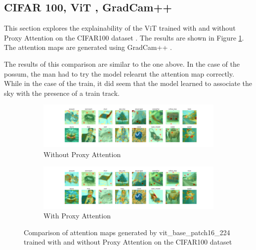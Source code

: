\documentclass[a4paper,11pt,openright]{book}
\begin{document}
\subsection{CIFAR 100, ViT , GradCam++}
This section explores the explainability of the ViT \cite{dosovitskiyImageWorth16x162021} trained with and without Proxy Attention on the CIFAR100 dataset \cite{krizhevskyLearningMultipleLayers}. The results are shown in Figure \ref{fig:vit_cifar100}. The attention maps are generated using GradCam++ \cite{chattopadhayGradCAMGeneralizedGradientBased2018}.

The results of this comparison are similar to the one above. In the case of the possum, the man had to try the model relearnt the attention map correctly. While in the case of the train, it did seem that the model learned to associate the sky with the presence of a train track. 

\begin{figure}[!htb]
        \begin{subfigure}[b]{1\textwidth}
            \includegraphics[width=\linewidth]{images/cifar100_vit_base_patch16_224_noproxy_0.pdf}
            \caption{Without Proxy Attention}
        \end{subfigure}
        \begin{subfigure}[b]{1\textwidth}
            \includegraphics[width=\linewidth]{images/cifar100_vit_base_patch16_224_proxy_0.pdf}
            \caption{With Proxy Attention}
        \end{subfigure}
        \caption{Comparison of attention maps generated by vit\_base\_patch16\_224 trained with and without Proxy Attention on the CIFAR100 dataset}
        \label{fig:vit_cifar100}
    \end{figure}
    
\end{document}
